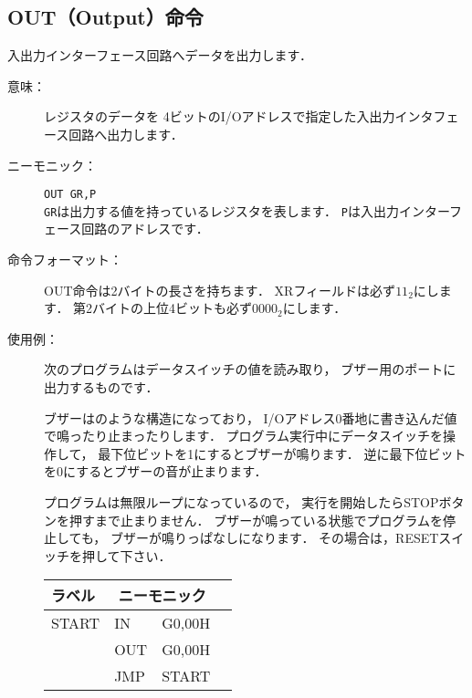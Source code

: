 \subsection{OUT（Output）命令}
\label{out}

入出力インターフェース回路へデータを出力します．

\begin{description}
\item[意味：]レジスタのデータを
4ビットのI/Oアドレスで指定した入出力インタフェース回路へ出力します．

\item[ニーモニック：]{\tt OUT  GR,P} \\
{\tt GR}は出力する値を持っているレジスタを表します．
{\tt P}は入出力インターフェース回路のアドレスです．

\item[命令フォーマット：]OUT命令は2バイトの長さを持ちます．
XRフィールドは必ず$11_2$にします．
第2バイトの上位4ビットも必ず$0000_2$にします．


\item[使用例：]
次のプログラムはデータスイッチの値を読み取り，
ブザー用のポートに出力するものです．

ブザーはのような構造になっており，
I/Oアドレス0番地に書き込んだ値で鳴ったり止まったりします．
プログラム実行中にデータスイッチを操作して，
最下位ビットを1にするとブザーが鳴ります．
逆に最下位ビットを0にするとブザーの音が止まります．

プログラムは無限ループになっているので，
実行を開始したらSTOPボタンを押すまで止まりません．
ブザーが鳴っている状態でプログラムを停止しても，
ブザーが鳴りっぱなしになります．
その場合は，RESETスイッチを押して下さい．

{\tt\small\begin{center}
\begin{tabular}{|l|l l|l}
\cline{1-3}
ラベル & \multicolumn{2}{|c|}{ニーモニック} \\
\hline
START & IN   & G0,00H  \\
      & OUT  & G0,00H  \\
      & JMP  & START   \\ 
\hline
\end{tabular}
\end{center}}


\end{description}

